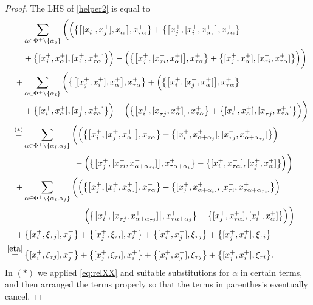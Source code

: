 \documentclass[11pt,reqno]{amsart}
\numberwithin{equation}{section}
\theoremstyle{definition}
\theoremstyle{remark}
\begin{document}
\begin{proof}
The LHS of \eqref{helper2} is equal to
\begin{align*}
&\sum_{\alpha\in\Phi^+\setminus\{\alpha_j\}}\bigg(\Big(\big\{\big[[x_i^+,x_j^+],x_\alpha^+\big],x_{\tau\alpha}^+\big\}+\big\{\big[x_j^+,[x_i^+,x_\alpha^+]\big],x_{\tau\alpha}^+\big\}\\
&+\big\{[x_j^+,x_\alpha^+],[x_i^+,x_{\tau\alpha}^+]\big\}\Big)-\Big(\big\{\big[x_j^+,[x_{\tau i}^-,x_\alpha^+]\big],x_{\tau\alpha}^+\big\}+\big\{[x_j^+,x_\alpha^+],[x_{\tau i}^-,x_{\tau\alpha}^+]\big\}\Big)\bigg)\\
+&\sum_{\alpha\in\Phi^+\setminus\{\alpha_i\}}\bigg(\big\{\big[[x_j^+,x_i^+],x_\alpha^+\big],x_{\tau\alpha}^+\big\}+\Big(\big\{\big[x_i^+,[x_j^+,x_\alpha^+]\big],x_{\tau\alpha}^+\big\}\\
&+\big\{[x_i^+,x_\alpha^+],[x_j^+,x_{\tau\alpha}^+]\big\}\Big)-\Big(\big\{\big[x_i^+,[x_{\tau j}^-,x_\alpha^+]\big],x_{\tau\alpha}^+\big\}+\big\{[x_i^+,x_\alpha^+],[x_{\tau j}^-,x_{\tau\alpha}^+]\big\}\Big)\bigg)\\
\stackrel{(*)}{=}&\sum_{\alpha\in\Phi^+\setminus\{\alpha_i,\alpha_j\}}\bigg(\Big(\big\{\big[x_i^+,[x_j^+,x_\alpha^+]\big],x_{\tau\alpha}^+\big\}-\big\{[x_i^+,x_{\alpha+\alpha_j}^+],[x_{\tau j}^-,x_{\alpha+\alpha_{\tau j}}^+]\big\}\Big)\\
&\qquad\qquad\qquad-\Big(\big\{\big[x_j^+,[x_{\tau i}^-,x_{\alpha+\alpha_{\tau i}}^+]\big],x_{\tau\alpha+\alpha_i}^+\big\}-\big\{[x_i^+,x_{\tau\alpha}^+],[x_j^+,x_\alpha^+]\big\}\Big)\bigg)\\
+&\sum_{\alpha\in\Phi^+\setminus\{\alpha_i,\alpha_j\}}\bigg(\Big(\big\{\big[x_j^+,[x_i^+,x_\alpha^+]\big],x_{\tau\alpha}^+\big\}-\big\{[x_j^+,x_{\alpha+\alpha_i}^+],[x_{\tau i}^-,x_{\tau\alpha+\alpha_{\tau i}}^+]\big\}\Big)\\
&\qquad\qquad\qquad-\Big(\big\{\big[x_i^+,[x_{\tau j}^-,x_{\alpha+\alpha_{\tau j}}^+]\big],x_{\tau\alpha+\alpha_j}^+\big\}-\big\{[x_j^+,x_{\tau\alpha}^+],[x_i^+,x_\alpha^+]\big\}\Big)\bigg)\\
+&\,\big\{[x_i^+,\xi_{\tau j}],x_j^+\big\}+\big\{[x_j^+,\xi_{\tau i}],x_i^+\big\}+\big\{[x_i^+,x_j^+],\xi_{\tau j}\big\}+\big\{[x_j^+,x_i^+],\xi_{\tau i}\big\}\\
\stackrel{\eqref{eta}}{=}&\,\big\{[x_i^+,\xi_{\tau j}],x_j^+\big\}+\big\{[x_j^+,\xi_{\tau i}],x_i^+\big\}+\big\{[x_i^+,x_j^+],\xi_{\tau j}\big\}+\big\{[x_j^+,x_i^+],\xi_{\tau i}\big\}.
\end{align*}
In $(*)$ we applied \eqref{eq:relXX} and suitable substitutions for $\alpha$ in certain terms, and then arranged the terms properly so that the terms in parenthesis eventually cancel.
\end{proof}
\end{document}
